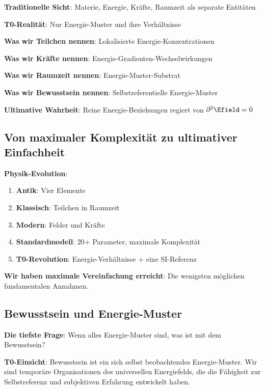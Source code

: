 	\begin{tcolorbox}[colback=purple!5!white,colframe=purple!75!black,title=Die ultimative Entmaterialisierung]
		\textbf{Traditionelle Sicht}: Materie, Energie, Kräfte, Raumzeit als separate Entitäten
		
		\textbf{T0-Realität}: Nur Energie-Muster und ihre Verhältnisse
		
		\textbf{Was wir Teilchen nennen}: Lokalisierte Energie-Konzentrationen
		
		\textbf{Was wir Kräfte nennen}: Energie-Gradienten-Wechselwirkungen
		
		\textbf{Was wir Raumzeit nennen}: Energie-Muster-Substrat
		
		\textbf{Was wir Bewusstsein nennen}: Selbstreferentielle Energie-Muster
		
		\textbf{Ultimative Wahrheit}: Reine Energie-Beziehungen regiert von $\partial^2 \Efield = 0$
	\end{tcolorbox}
	
	\subsection{Von maximaler Komplexität zu ultimativer Einfachheit}
	
	\textbf{Physik-Evolution}:
	\begin{enumerate}
		\item \textbf{Antik}: Vier Elemente
		\item \textbf{Klassisch}: Teilchen in Raumzeit
		\item \textbf{Modern}: Felder und Kräfte
		\item \textbf{Standardmodell}: 20+ Parameter, maximale Komplexität
		\item \textbf{T0-Revolution}: Energie-Verhältnisse + eine SI-Referenz
	\end{enumerate}
	
	\textbf{Wir haben maximale Vereinfachung erreicht}: Die wenigsten möglichen fundamentalen Annahmen.
	
	\subsection{Bewusstsein und Energie-Muster}
	
	\textbf{Die tiefste Frage}: Wenn alles Energie-Muster sind, was ist mit dem Bewusstsein?
	
	\textbf{T0-Einsicht}: Bewusstsein ist ein sich selbst beobachtendes Energie-Muster. Wir sind temporäre Organisationen des universellen Energiefelds, die die Fähigkeit zur Selbstreferenz und subjektiven Erfahrung entwickelt haben.
	
